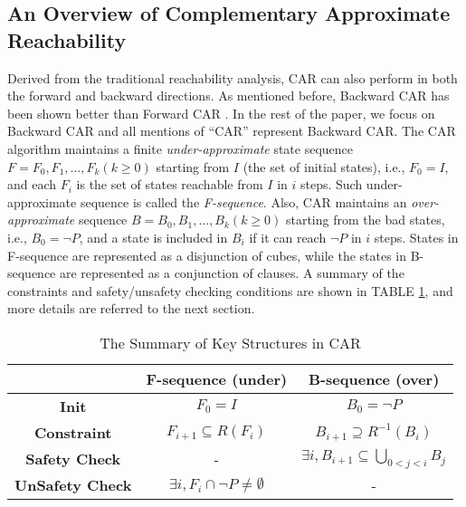 \subsection{An Overview of Complementary Approximate Reachability}

Derived from the traditional reachability analysis, CAR can also perform in both the forward and backward directions. 
As mentioned before, Backward CAR has been shown better than Forward CAR \cite{LDPRV18}. In the rest of the paper, we focus on Backward CAR and all mentions of ``CAR'' represent Backward CAR. 
The CAR algorithm maintains a finite \emph{under-approximate} state sequence $F=F_{0},F_{1},...,F_{k} (k\geq 0)$  starting from $I$  (the set of initial states), i.e., $F_{0}=I$,  and each $F_{i}$ is the set of states reachable from $I$ in $i$ steps. Such under-approximate sequence is called the \emph{F-sequence}. Also, CAR maintains an \emph{over-approximate} sequence $B = B_{0},B_{1},...,B_{k} (k\geq 0)$ starting from the bad states, i.e., $B_{0}=\neg P$, and a state is included in $B_{i}$ if it can reach $\neg P$ in $i$ steps. States in F-sequence are represented as a disjunction of cubes, while the states in B-sequence are represented as a conjunction of clauses. A summary of the constraints and safety/unsafety checking conditions are shown in TABLE \ref{tab:car}, and more details are referred to the next section.

\begin{table}
\caption{The Summary of Key Structures in CAR}\label{tab:car}
\begin{tabular}{|c|c|c|} %
\hline 
&\textbf{F-sequence (under)}&\textbf{B-sequence (over)}\\
\hline  
\textbf{Init}&$F_{0}=I$&$B_{0}=\neg P$\\
\hline
\textbf{Constraint}&$F_{i+1}\subseteq R(F_{i})$&$B_{i+1}\supseteq R^{-1}(B_{i})$ \\
\hline
\textbf{Safety Check}&-&$\exists i, B_{i+1}\subseteq \bigcup_{0<j<i}B_{j}$ \\
\hline
\textbf{UnSafety Check}&$\exists i,F_{i}\cap \neg P \neq \emptyset$&- \\
\hline
\end{tabular}
\end{table}


